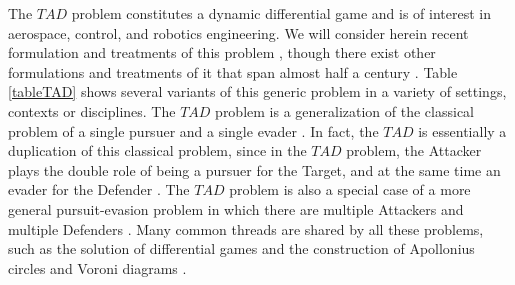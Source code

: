 \documentclass[final,5p,times,twocolumn]{elsarticle}
\begin{document}
The $TAD$ problem constitutes a dynamic differential game \cite{ho1965differential,isaacs1954differential,meier1969new,hsueh2007differential,yi2010improved,bressan2010noncooperative,perelman2011cooperative,battistini2014differential,yavin2014pursuit} and is of interest in aerospace, control, and robotics engineering. We will consider herein recent formulation and treatments of this problem \cite{pachter2014active,garcia2015active,garcia2015escape,garcia2014cooperative,garcia2015cooperative,garcia2015cooperative2}, though there exist other formulations and treatments of it that span almost half a century \cite{boyell1976defending,shneydor1977comments,rusnak2005lady,rusnak2008guidance,de2010analysis,rusnak2011guidance,fuch2011encouraging,scott2013pursuit,rubinsky2013three,oyler2014pursuit}.
Table \ref{tableTAD} shows several variants of this generic problem in a variety of settings, contexts or disciplines. The $TAD$ problem is a generalization of the classical problem of a single pursuer and a single evader \cite{anderson1978model,miller1994co,cliff1995co,pekalski2004short,zarchan2002tactical}. In fact, the $TAD$ is essentially a duplication of this classical problem, since in the $TAD$ problem, the Attacker plays the double role of being a pursuer for the Target, and at the same time an evader for the Defender \cite{rusnak2008guidance}.
The $TAD$ problem is also a special case of a more general pursuit-evasion problem in which there are multiple Attackers and multiple Defenders  \cite{hagedorn1976differential,kim2001multiagent,fuchs2010cooperative,pan2012pursuit,ragesh2014analysis}. Many common threads are shared by all these problems, such as the solution of differential games \cite{ho1965differential,isaacs1954differential,meier1969new,hsueh2007differential,yi2010improved,bressan2010noncooperative,perelman2011cooperative,battistini2014differential,yavin2014pursuit} and the construction of Apollonius circles \cite{ayoub2003proving,ayoub2006circle,partensky2008circle,fulton2015conflict} and Voroni diagrams \cite{gowda1983dynamic,aurenhammer1991voronoi,cheung2007pursuit,gavrilova2008generalized,majdandzic2008computation,bakolas2010optimal,bakolas2010zermelo,bakolas2010optimal}.
\end{document}
